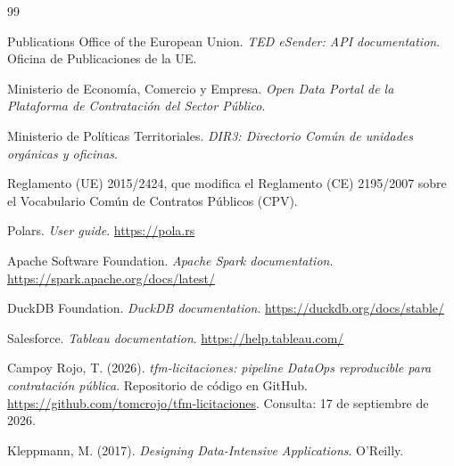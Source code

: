 \documentclass[11pt,a4paper]{article}
\begin{document}
\clearpage
\begin{thebibliography}{99}

 Publications Office of the European Union.
\emph{TED eSender: API documentation}. Oficina de Publicaciones de la UE.

 Ministerio de Economía, Comercio y Empresa.
\emph{Open Data Portal de la Plataforma de Contratación del Sector Público}.

 Ministerio de Políticas Territoriales.
\emph{DIR3: Directorio Común de unidades orgánicas y oficinas}.

 Reglamento (UE) 2015/2424, que modifica el Reglamento (CE) 2195/2007
sobre el Vocabulario Común de Contratos Públicos (CPV).

 Polars. \emph{User guide}. \url{https://pola.rs}

 Apache Software Foundation. \emph{Apache Spark documentation}.
\url{https://spark.apache.org/docs/latest/}

 DuckDB Foundation. \emph{DuckDB documentation}.
\url{https://duckdb.org/docs/stable/}

 Salesforce. \emph{Tableau documentation}.
\url{https://help.tableau.com/}

 Campoy Rojo, T. (2026).
\emph{tfm-licitaciones: pipeline DataOps reproducible para contratación
pública}. Repositorio de código en GitHub.
\url{https://github.com/tomcrojo/tfm-licitaciones}. Consulta: 17 de septiembre
de 2026.

 Kleppmann, M. (2017). \emph{Designing Data-Intensive
Applications}. O'Reilly.

\end{thebibliography}
\end{document}

